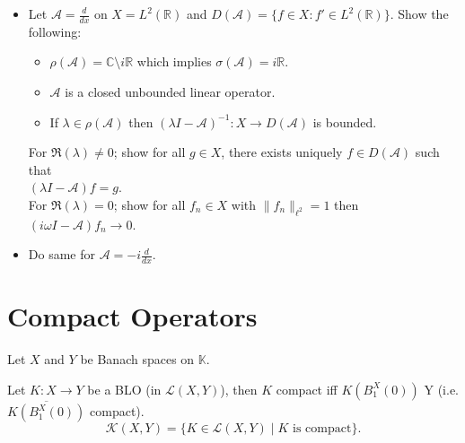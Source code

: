 \documentclass[12pt, oneside]{book}
\begin{document}
\begin{exercise}{}{}
	\begin{itemize}
		\item [1.] Let $\mathscr{A}=\frac{d}{dx}$ on $X=L^2(\mathbb{R})$ and $D(\mathscr{A})=\{f\in X: f'\in L^2(\mathbb{R})\}$. Show the following:
		\begin{itemize}
			\item [a.] $\rho(\mathscr{A})=\mathbb{C}\setminus i\mathbb{R}$ which implies $\sigma(\mathscr{A})=i\mathbb{R}$.
			\item [b.] $\mathscr{A}$ is a closed unbounded linear operator.
			\item [c.] If $\lambda\in \rho(\mathscr{A})$ then $(\lambda I-\mathscr{A})^{-1}:X\longrightarrow D(\mathscr{A})$ is bounded.
		\end{itemize}
For $\Re(\lambda)\neq 0$; show for all $g\in X$, there exists uniquely $f\in D(\mathscr{A})$ such that \\ $(\lambda I-\mathscr{A})f=g$.\\
For $\Re(\lambda)= 0$; show for all $f_n\in X$ with $\|f_n\|_{\ell^2}=1$ then $(i\omega I-\mathscr{A})f_n\rightarrow 0$.
\item [2.] Do same for $\mathscr{A}=-i\frac{d}{dx}$.
	\end{itemize}
	
\end{exercise}		
		
\section{Compact Operators}
Let $X$ and $Y$ be Banach spaces on $\mathbb{K}$.

\begin{definition}
Let $K:X\to Y$ be a BLO (in $\mathcal{L}(X,Y)$), then $K$ compact iff
$
K(B_1^X(0))$  Y (i.e. $\overline{K(B_1^X(0))}$ compact).
\vspace{-2mm}
\[
\mathcal{K}(X,Y)=\{K\in \mathcal{L}(X,Y)\mid K \text{ is compact}\}.
\]
\end{definition}
\end{document}
